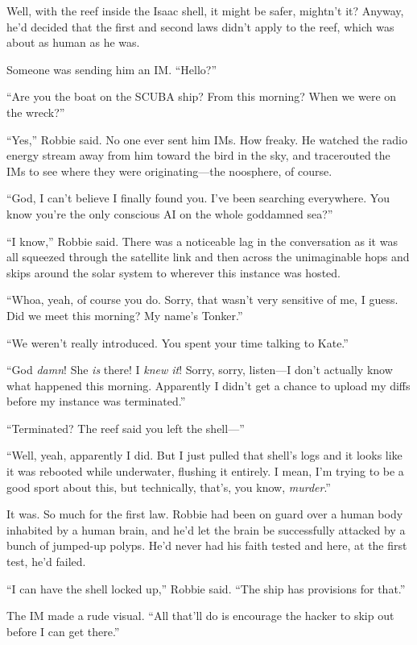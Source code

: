 Well, with the reef inside the Isaac shell, it might be safer,
mightn’t it? Anyway, he’d decided that the first and second laws
didn’t apply to the reef, which was about as human as he was.

Someone was sending him an IM. “Hello?”

“Are you the boat on the SCUBA ship? From this morning? When we
were on the wreck?”

“Yes,” Robbie said. No one ever sent him IMs. How freaky. He
watched the radio energy stream away from him toward the bird in
the sky, and tracerouted the IMs to see where they were
originating—the noosphere, of course.

“God, I can’t believe I finally found you. I’ve been searching
everywhere. You know you’re the only conscious AI on the whole
goddamned sea?”

“I know,” Robbie said. There was a noticeable lag in the
conversation as it was all squeezed through the satellite link and
then across the unimaginable hops and skips around the solar system
to wherever this instance was hosted.

“Whoa, yeah, of course you do. Sorry, that wasn’t very sensitive of
me, I guess. Did we meet this morning? My name’s Tonker.”

“We weren’t really introduced. You spent your time talking to
Kate.”

“God \emph{damn}! She \emph{is} there! I \emph{knew it}! Sorry,
sorry, listen—I don’t actually know what happened this morning.
Apparently I didn’t get a chance to upload my diffs before my
instance was terminated.”

“Terminated? The reef said you left the shell—”

“Well, yeah, apparently I did. But I just pulled that shell’s logs
and it looks like it was rebooted while underwater, flushing it
entirely. I mean, I’m trying to be a good sport about this, but
technically, that’s, you know, \emph{murder}.”

It was. So much for the first law. Robbie had been on guard over a
human body inhabited by a human brain, and he’d let the brain be
successfully attacked by a bunch of jumped-up polyps. He’d never
had his faith tested and here, at the first test, he’d failed.

“I can have the shell locked up,” Robbie said. “The ship has
provisions for that.”

The IM made a rude visual. “All that’ll do is encourage the hacker
to skip out before I can get there.”

